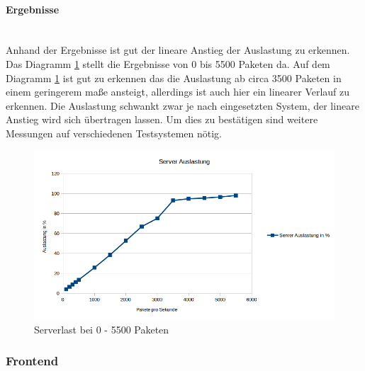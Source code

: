 \documentclass[a4paper]{spie}  %
\begin{document}
\begin{minipage}[t]{0.4\textwidth}
	\vspace{0pt}
	\paragraph{Ergebnisse}\mbox{}\\
	Anhand der Ergebnisse ist gut der lineare Anstieg der Auslastung zu erkennen. Das Diagramm \ref{fig:ServerLast2} stellt die Ergebnisse von 0 bis 5500 Paketen da. Auf dem Diagramm \ref{fig:ServerLast2} ist gut zu erkennen das die Auslastung ab circa 3500 Paketen in einem geringerem maße ansteigt, allerdings ist auch hier ein linearer Verlauf zu erkennen. Die Auslastung schwankt zwar je nach eingesetzten System, der lineare Anstieg wird sich übertragen lassen. Um dies zu bestätigen sind weitere Messungen auf verschiedenen Testsystemen nötig.
\end{minipage}
\hfill
\begin{minipage}[t]{0.5\textwidth}
	\begin{figure}[H]	
	\vspace{0pt}
		\centering
		\includegraphics[width=1\textwidth]{./images/ServerLast3.png}
		\caption{Serverlast bei 0 - 5500 Paketen}
		\label{fig:ServerLast2}
	\end{figure}		
\end{minipage}


\subsubsection{Frontend}
\end{document}
